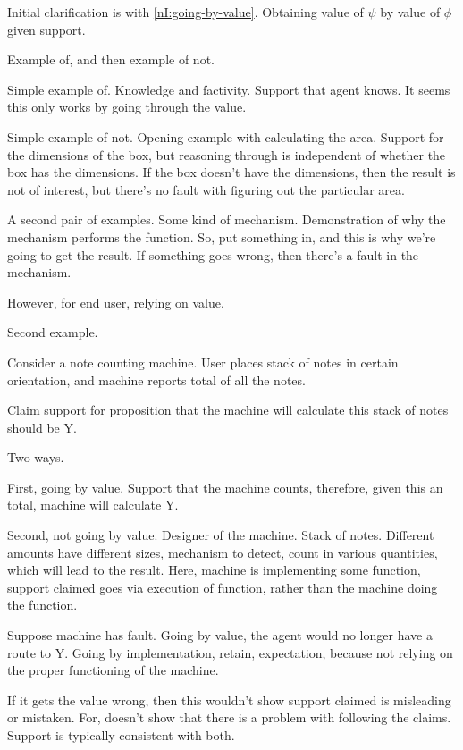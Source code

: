 \begin{note}[Clarifying \nI{}]
  Initial clarification is with \ref{nI:going-by-value}.
  Obtaining value of \(\psi\) by value of \(\phi\) given support.

  Example of, and then example of not.

  Simple example of.
  Knowledge and factivity.
  Support that agent knows.
  It seems this only works by going through the value.


  Simple example of not.
  Opening example with calculating the area.
  Support for the dimensions of the box, but reasoning through is independent of whether the box has the dimensions.
  If the box doesn't have the dimensions, then the result is not of interest, but there's no fault with figuring out the particular area.


  A second pair of examples.
  Some kind of mechanism.
  Demonstration of why the mechanism performs the function.
  So, put something in, and this is why we're going to get the result.
  If something goes wrong, then there's a fault in the mechanism.

  However, for end user, relying on value.

  Second example.

  Consider a note counting machine.
  User places stack of notes in certain orientation, and machine reports total of all the notes.

  Claim support for proposition that the machine will calculate this stack of notes should be Y.

  Two ways.

  First, going by value.
  Support that the machine counts, therefore, given this an total, machine will calculate Y.

  Second, not going by value.
  Designer of the machine.
  Stack of notes.
  Different amounts have different sizes, mechanism to detect, count in various quantities, which will lead to the result.
  Here, machine is implementing some function, support claimed goes via execution of function, rather than the machine doing the function.

  Suppose machine has fault.
  Going by value, the agent would no longer have a route to Y.
  Going by implementation, retain, expectation, because not relying on the proper functioning of the machine.


  If it gets the value wrong, then this wouldn't show support claimed is misleading or mistaken.
  For, doesn't show that there is a problem with following the claims.
  Support is typically consistent with both.
\end{note}

